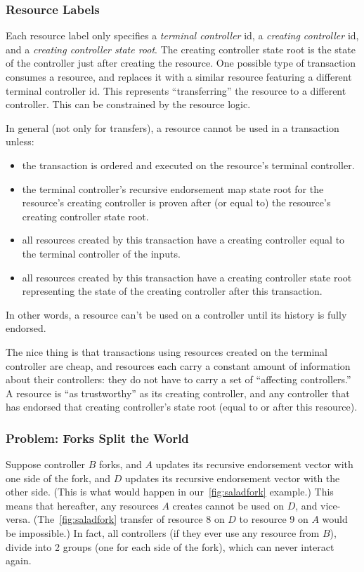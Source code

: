 \documentclass[a4paper,USenglish,cleveref, autoref, thm-restate, anonymous]{lipics-v2021}
\begin{document}
\subsubsection{Resource Labels}
Each resource label only specifies a \textit{terminal controller} id, a \textit{creating controller} id, and a \textit{creating controller state root}.
The creating controller state root is the state of the controller just after creating  the resource.
One possible type of transaction consumes a resource, and replaces it with a similar resource featuring a different terminal controller id.
This represents ``transferring'' the resource to a different controller. 
This can be constrained by the resource logic. 

In general (not only for transfers), a resource cannot be used in a transaction unless:
\begin{itemize}
    \item the transaction is ordered and executed on the resource's terminal controller.
    \item the terminal controller's recursive endorsement map state root for the resource's creating controller is proven after (or equal to) the resource's creating controller state root.
    \item all resources created by this transaction have a creating controller equal to the terminal controller of the inputs. 
    \item all resources created by this transaction have a creating controller state root representing the state of the creating controller after this transaction.
\end{itemize}
In other words, a resource can't be used on a controller until its history is fully endorsed. 

The nice thing is that transactions using resources created on the terminal controller are cheap, and resources each carry a constant amount of information about their controllers: they do not have to carry a set of ``affecting controllers.''
A resource is ``as trustworthy'' as its creating controller, and any controller that has endorsed that creating controller's state root (equal to or after this resource).


\subsubsection{Problem: Forks Split the World}
Suppose controller $B$ forks, and $A$ updates its recursive endorsement vector with one side of the fork, and $D$ updates its recursive endorsement vector with the other side. 
(This is what would happen in our~\cref{fig:saladfork} example.)
This means that hereafter, any resources $A$ creates cannot be used on $D$, and vice-versa. 
(The~\cref{fig:saladfork} transfer of resource 8 on $D$ to resource 9 on $A$ would be impossible.)
In fact, all controllers (if they ever use any resource from $B$), divide into 2 groups (one for each side of the fork), which can never interact again. 
\end{document}
